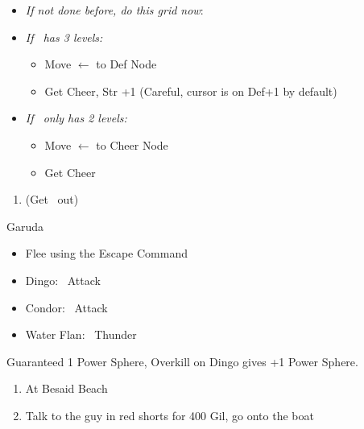 \begin{spheregrid}
    \begin{itemize}
        \item \textit{If not done before, do this grid now}:
        \item \textit{If \tidus\ has 3 levels:}
        \begin{itemize}
            \item Move $\leftarrow$ to Def Node
            \item Get Cheer, Str +1 (Careful, cursor is on Def+1 by default)
        \end{itemize}
        \item \textit{If \tidus\ only has 2 levels:}
        \begin{itemize}
            \item Move $\leftarrow$ to Cheer Node
            \item Get Cheer
        \end{itemize}
    \end{itemize}
\end{spheregrid}
\begin{enumerate}[resume]
    \item \formation{\tidus}{\yuna}{\lulu} (Get \wakka\ out)
\end{enumerate}
\begin{battle}{Garuda}
    \begin{itemize}
        \item Flee using the Escape Command
    \end{itemize}
\end{battle}
\begin{encounters}
    \begin{itemize}
        \item Dingo: \tidus\ Attack
        \item Condor: \wakka\ Attack
        \item Water Flan: \lulu\ Thunder
    \end{itemize}
    Guaranteed 1 Power Sphere, Overkill on Dingo gives +1 Power Sphere.
\end{encounters}
\begin{enumerate}[resume]
    \item At Besaid Beach \save
    \item Talk to the guy in red shorts for 400 Gil, go onto the boat
\end{enumerate}
\winnp\lossnp\bothnp
